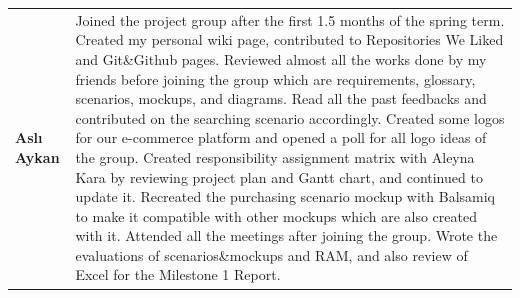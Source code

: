 \documentclass[]{article}
\begin{document}
\begin{table}[H]
{\begin{tabulary}{1.3\textwidth}{LL}
            \textbf{Aslı Aykan}         & Joined the project group after the first 1.5 months of the spring term. Created my personal wiki page, contributed to Repositories We Liked and Git\&Github pages. Reviewed almost all the works done by my friends before joining the group which are requirements, glossary, scenarios, mockups, and diagrams. Read all the past feedbacks and contributed on the searching scenario accordingly. Created some logos for our e-commerce platform and opened a poll for all logo ideas of the group. Created responsibility assignment matrix with Aleyna Kara by reviewing project plan and Gantt chart, and continued to update it. Recreated the purchasing scenario mockup with Balsamiq to make it compatible with other mockups which are also created with it. Attended all the meetings after joining the group. Wrote the evaluations of scenarios\&mockups and RAM, and also review of Excel for the Milestone 1 Report.                                                                                                                                                                                                                                                                                                                                                                                                                                                                                                                                                                                                                                                                                    \\
        \end{tabulary}
    }
\end{table}
\end{document}
